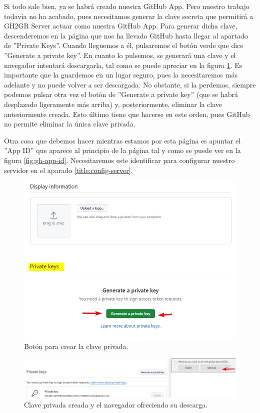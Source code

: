 Si todo sale bien, ya se habrá creado nuestra GitHub App. Pero nuestro trabajo todavía no ha acabado, pues necesitamos generar la clave secreta que permitirá a GH2GR Server actuar como nuestra GitHub App. Para generar dicha clave, descenderemos en la página que nos ha llevado GitHub hasta llegar al apartado de ''Private Keys''. Cuando lleguemos a él, pulsaremos el botón verde que dice ''Generate a private key''. En cuanto lo pulsemos, se generará una clave y el navegador intentará descargarla, tal como se puede apreciar en la figura \ref{fig:download-secret-key}. Es importante que la guardemos en un lugar seguro, pues la necesitaremos más adelante y no puede volver a ser descargada. No obstante, si la perdemos, siempre podemos pulsar otra vez el botón de ''Generate a private key'' (que se habrá desplazado ligeramente más arriba) y, posteriormente, eliminar la clave anteriormente creada. Esto último tiene que hacerse en este orden, pues GitHub no permite eliminar la única clave privada.

Otra cosa que debemos hacer mientras estamos por esta página es apuntar el ''App ID'' que aparece al principio de la página tal y como se puede ver en la figura \ref{fig:gh-app-id}. Necesitaremos este identificar para configurar nuestro servidor en el aparado \ref{title:config-server}.

\begin{figure}
    \centering
    \includegraphics[width=0.5\linewidth]{images/generate-secret-key-.png}
    \caption{Botón para crear la clave privada.}
\end{figure}

\begin{figure}
    \centering
    \includegraphics[width=0.5\linewidth]{images/generate-secret-key-download.png}
    \caption{Clave privada creada y el navegador ofreciendo su descarga.}
    \label{fig:download-secret-key}
\end{figure}

